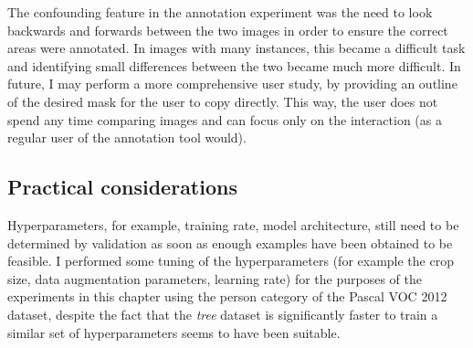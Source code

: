 \begin{table*}[!ht]
  \centering
    \caption{Statistics from annotating the validation set in different ways. Precision, recall and IOU are a comparison with the original validation set. Note figures in brackets are the original statistics of the unmodified predictions from the model}

\noindent{}

\label{tab:annotation_exp}
\end{table*}


The confounding feature in the annotation experiment was the need to look backwards and forwards between the two images in order to ensure the correct areas were annotated. In images with many instances, this became a difficult task and identifying small differences between the two became much more difficult. In future, I may perform a more comprehensive user study, by providing an outline of the desired mask for the user to copy directly. This way, the user does not spend any time comparing images and can focus only on the interaction (as a regular user of the annotation tool would).


\subsection{Practical considerations}

Hyperparameters, for example, training rate, model architecture, still need to be determined by validation as soon as enough examples have been obtained to be feasible. I performed some tuning of the hyperparameters (for example the crop size, data augmentation parameters, learning rate) for the purposes of the experiments in this chapter using the person category of the Pascal \gls{VOC} 2012 dataset, despite the fact that the \emph{tree} dataset is significantly faster to train a similar set of hyperparameters seems to have been suitable.


